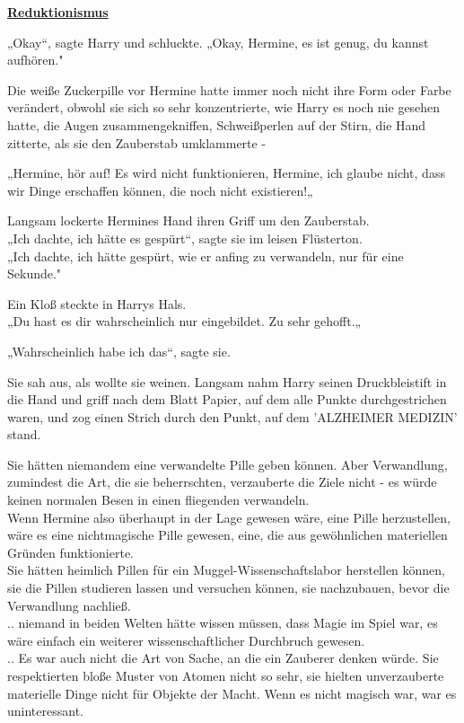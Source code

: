 

\hypertarget{reduktionismus}{%

\textbf{\uline{Reduktionismus}}

„Okay“, sagte Harry und schluckte. „Okay, Hermine, es ist genug, du kannst aufhören."

Die weiße Zuckerpille vor Hermine hatte immer noch nicht ihre Form oder Farbe verändert, obwohl sie sich so sehr konzentrierte, wie Harry es noch nie gesehen hatte, die Augen zusammengekniffen, Schweißperlen auf der Stirn, die Hand zitterte, als sie den Zauberstab umklammerte -

„Hermine, hör auf! Es wird nicht funktionieren, Hermine, ich glaube nicht, dass wir Dinge erschaffen können, die noch nicht existieren!„

Langsam lockerte Hermines Hand ihren Griff um den Zauberstab.\\ „Ich dachte, ich hätte es gespürt“, sagte sie im leisen Flüsterton.\\ „Ich dachte, ich hätte gespürt, wie er anfing zu verwandeln, nur für eine Sekunde."

Ein Kloß steckte in Harrys Hals.\\ „Du hast es dir wahrscheinlich nur eingebildet. Zu sehr gehofft.„

„Wahrscheinlich habe ich das“, sagte sie.

Sie sah aus, als wollte sie weinen. Langsam nahm Harry seinen Druckbleistift in die Hand und griff nach dem Blatt Papier, auf dem alle Punkte durchgestrichen waren, und zog einen Strich durch den Punkt, auf dem 'ALZHEIMER MEDIZIN' stand.

Sie hätten niemandem eine verwandelte Pille geben können. Aber Verwandlung, zumindest die Art, die sie beherrschten, verzauberte die Ziele nicht - es würde keinen normalen Besen in einen fliegenden verwandeln.\\ Wenn Hermine also überhaupt in der Lage gewesen wäre, eine Pille herzustellen, wäre es eine nichtmagische Pille gewesen, eine, die aus gewöhnlichen materiellen Gründen funktionierte.\\ Sie hätten heimlich Pillen für ein Muggel-Wissenschaftslabor herstellen können, sie die Pillen studieren lassen und versuchen können, sie nachzubauen, bevor die Verwandlung nachließ.\\ .. niemand in beiden Welten hätte wissen müssen, dass Magie im Spiel war, es wäre einfach ein weiterer wissenschaftlicher Durchbruch gewesen.\\ .. Es war auch nicht die Art von Sache, an die ein Zauberer denken würde. Sie respektierten bloße Muster von Atomen nicht so sehr, sie hielten unverzauberte materielle Dinge nicht für Objekte der Macht. Wenn es nicht magisch war, war es uninteressant.

}
